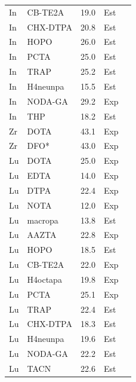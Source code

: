 \documentclass[journal=jacsat,manuscript=suppinfo]{achemso}
\begin{document}
\begin{longtable}{@{}llcp{1.5cm}c@{}}
  In & CB-TE2A  & 19.0  & Est & \cite{MartellSmith2004,Hancock1989} \\
  In & CHX-DTPA & 20.8  & Est & \cite{MartellSmith2004,Hancock1989} \\
  In & HOPO     & 26.0  & Est & \cite{MartellSmith2004,Hancock1989} \\
  In & PCTA     & 25.0  & Est & \cite{MartellSmith2004,Hancock1989} \\
  In & TRAP     & 25.2  & Est & \cite{MartellSmith2004,Hancock1989} \\
  In & H4neunpa & 15.5  & Est & \cite{MartellSmith2004,Hancock1989} \\
  In & NODA-GA  & 29.2  & Exp & \cite{Morgan2023} \\
  In & THP      & 18.2  & Est & \cite{MartellSmith2004,Hancock1989} \\
  Zr & DOTA     & 43.1  & Exp & \cite{Blei2023} \\
  Zr & DFO*     & 43.0  & Exp & \cite{Blei2023} \\
  Lu & DOTA     & 25.0  & Exp & \cite{deLeonRodriguez2008} \\
  Lu & EDTA     & 14.0  & Exp & \cite{MartellSmith2004} \\
  Lu & DTPA     & 22.4  & Exp & \cite{MartellSmith2004} \\
  Lu & NOTA     & 12.0  & Exp & \cite{MartellSmith2004} \\
  Lu & macropa  & 13.8  & Est & \cite{MartellSmith2004,Hancock1989} \\
  Lu & AAZTA    & 22.8  & Exp & \cite{Baranyai2007} \\
  Lu & HOPO     & 18.5  & Est & \cite{MartellSmith2004,Hancock1989} \\
  Lu & CB-TE2A  & 22.0  & Exp & \cite{MartellSmith2004} \\
  Lu & H4octapa & 19.8  & Exp & \cite{Morgan2023} \\
  Lu & PCTA     & 25.1  & Exp & \cite{MartellSmith2004} \\
  Lu & TRAP     & 22.4  & Est & \cite{MartellSmith2004,Hancock1989} \\
  Lu & CHX-DTPA & 18.3  & Est & \cite{MartellSmith2004,Hancock1989} \\
  Lu & H4neunpa & 19.6  & Est & \cite{MartellSmith2004,Hancock1989} \\
  Lu & NODA-GA  & 22.2  & Est & \cite{MartellSmith2004,Hancock1989} \\
  Lu & TACN     & 22.6  & Est & \cite{MartellSmith2004,Hancock1989} \\

\end{longtable}
\end{document}
